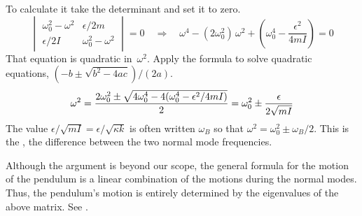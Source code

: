 To calculate it
take the determinant and set it to zero.
\begin{equation*}
  \begin{vmatrix}
    \omega_0^2-\omega^2    &\epsilon/2m  \\
    \epsilon/2I &\omega_0^2-\omega^2
  \end{vmatrix}=0 \quad\Longrightarrow\quad
  \omega^4-(2\omega_0^2)\,\omega^2 +(\omega_0^4
  -\frac{\epsilon^2}{4mI})=0
\end{equation*}
That equation is quadratic in~$\omega^2$.  
Apply the formula to solve quadratic equations, $(-b\pm\sqrt{b^2-4ac})/(2a)$.
\begin{equation*}   %
  \omega^2 
  =\frac{2\omega_0^2
    \pm\sqrt{\smash[b]{\strut} 4\omega_0^4
      -4(\omega_0^4-\epsilon^2/4mI)}}{2}
  =\omega_0^2\pm\frac{\epsilon}{2\sqrt{mI}}
\end{equation*}
The value $\epsilon/\sqrt{mI}=\epsilon/\sqrt{\kappa k}$ is often written
$\omega_B$ so that
$
\omega^2 =\omega_0^2\pm\omega_B/2
$.
This is the , the difference
between the two normal mode frequencies.

Although the argument is beyond our scope, the general formula for the 
motion of the pendulum is a linear combination of the motions during 
the normal modes.
Thus, the pendulum's motion is entirely determined by the eigenvalues
of the above matrix.
See \cite{BergMarshall}.

